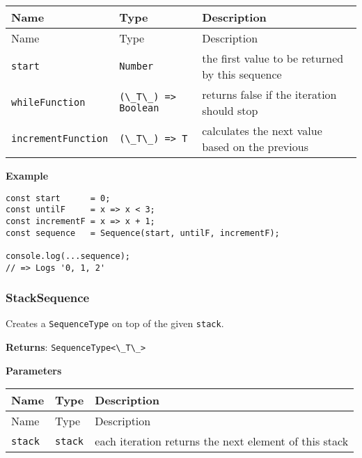 \begin{longtable}[]{
  >{\raggedright\arraybackslash}p{}
  >{\raggedright\arraybackslash}p{}
  >{\raggedright\arraybackslash}p{}@{}}

\toprule\noalign{}
Name & Type & Description \\
\midrule\noalign{}
\endfirsthead
\toprule\noalign{}
Name & Type & Description \\
\midrule\noalign{}
\endhead
\bottomrule\noalign{}
\endlastfoot
\passthrough{\lstinline!start!} & \passthrough{\lstinline!Number!} & the
first value to be returned by this sequence \\
\passthrough{\lstinline!whileFunction!} &
\passthrough{\lstinline!(\_T\_) => Boolean!} & returns false if the
iteration should stop \\
\passthrough{\lstinline!incrementFunction!} &
\passthrough{\lstinline!(\_T\_) => T!} & calculates the next value based
on the previous \\
\end{longtable}

\textbf{Example}

\begin{lstlisting}[label=5406966c-7de8-40e2-a7bc-d4b4bf19446e]
const start      = 0;
const untilF     = x => x < 3;
const incrementF = x => x + 1;
const sequence   = Sequence(start, untilF, incrementF);
                                                       
console.log(...sequence);
// => Logs '0, 1, 2'
\end{lstlisting}

\hypertarget{d2f69237-b438-43d6-ba25-b401cd07e451}{%
\subsubsection{StackSequence}\label{d2f69237-b438-43d6-ba25-b401cd07e451}}

Creates a \passthrough{\lstinline!SequenceType!} on top of the given
\passthrough{\lstinline!stack!}.

\textbf{Returns}: \passthrough{\lstinline!SequenceType<\_T\_>!}

\textbf{Parameters}

\begin{longtable}[]{
  >{\raggedright\arraybackslash}p{}
  >{\raggedright\arraybackslash}p{}
  >{\raggedright\arraybackslash}p{}@{}}
\toprule\noalign{}
Name & Type & Description \\
\midrule\noalign{}
\endfirsthead
\toprule\noalign{}
Name & Type & Description \\
\midrule\noalign{}
\endhead
\bottomrule\noalign{}
\endlastfoot
\passthrough{\lstinline!stack!} & \passthrough{\lstinline!stack!} & each
iteration returns the next element of this stack \\
\end{longtable}

